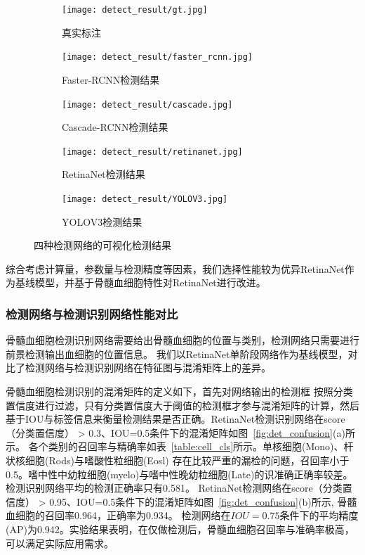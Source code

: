 \begin{figure}[htbp]
	\centering
	\begin{subfigure}{0.9\linewidth}
		\centering
		\texttt{[image: detect\_result/gt.jpg]}
    \caption{真实标注}
	\end{subfigure}
	\centering
	\begin{subfigure}{0.9\linewidth}
		\centering
		\texttt{[image: detect\_result/faster\_rcnn.jpg]}
    \caption{Faster-RCNN检测结果}
	\end{subfigure}
	\centering
	\begin{subfigure}{0.9\linewidth}
		\centering
		\texttt{[image: detect\_result/cascade.jpg]}
    \caption{Cascade-RCNN检测结果}
	\end{subfigure}
	\centering
	\begin{subfigure}{0.9\linewidth}
		\centering
		\texttt{[image: detect\_result/retinanet.jpg]}
    \caption{RetinaNet检测结果}
	\end{subfigure}
	\centering
  \begin{subfigure}{0.9\linewidth}
		\centering
		\texttt{[image: detect\_result/YOLOV3.jpg]}
    \caption{YOLOV3检测结果}
	\end{subfigure}
	\caption{四种检测网络的可视化检测结果}
	\label{fig:detect_result}
\end{figure}

综合考虑计算量，参数量与检测精度等因素，我们选择性能较为优异RetinaNet作为基线模型，并基于骨髓血细胞特性对RetinaNet进行改进。

\subsubsection{检测网络与检测识别网络性能对比}
\label{section:detect}

骨髓血细胞检测识别网络需要给出骨髓血细胞的位置与类别，检测网络只需要进行前景检测输出血细胞的位置信息。
我们以RetinaNet单阶段网络作为基线模型，对比了检测网络与检测识别网络在特征图与混淆矩阵上的差异。

骨髓血细胞检测识别的混淆矩阵的定义如下，首先对网络输出的检测框
按照分类置信度进行过滤，只有分类置信度大于阈值的检测框才参与混淆矩阵的计算，然后
基于IOU与标签信息来衡量检测结果是否正确。RetinaNet检测识别网络在score（分类置信度） > 0.3、IOU=0.5条件下的混淆矩阵如图~\ref{fig:det_confusion}(a)所示。
各个类别的召回率与精确率如表~\ref{table:cell_cls}所示。单核细胞(Mono)、杆状核细胞(Rods)与嗜酸性粒细胞(Eosl)
存在比较严重的漏检的问题，召回率小于0.5。嗜中性中幼粒细胞(myelo)与嗜中性晚幼粒细胞(Late)的识准确正确率较差。
检测识别网络平均的检测正确率只有0.581。
RetinaNet检测网络在score（分类置信度） > 0.95、IOU=0.5条件下的混淆矩阵如图~\ref{fig:det_confusion}(b)所示, 骨髓血细胞的召回率0.964，正确率为0.934。
检测网络在$IOU=0.75$条件下的平均精度(AP)为0.942。实验结果表明，在仅做检测后，骨髓血细胞召回率与准确率极高，可以满足实际应用需求。

